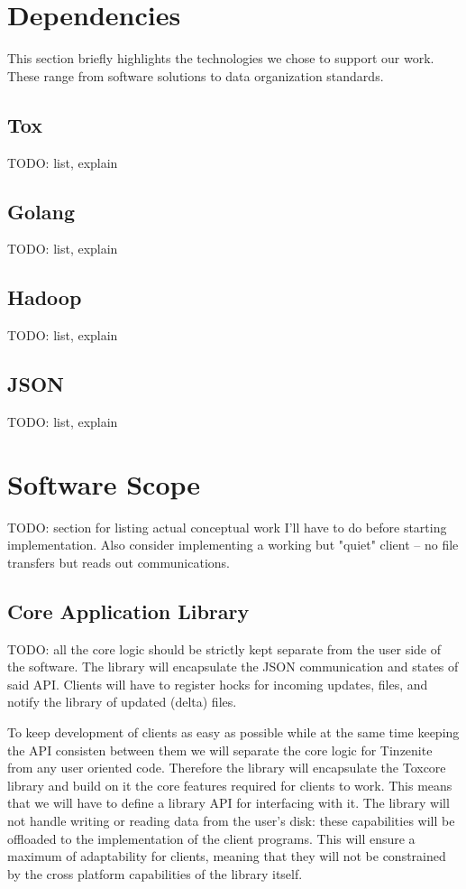 \section{Dependencies}

This section briefly highlights the technologies we chose to support our work.
These range from software solutions to data organization standards.

\subsection{Tox}

TODO: list, explain

\subsection{Golang}

TODO: list, explain

\subsection{Hadoop}

TODO: list, explain

\subsection{JSON}

TODO: list, explain

\section{Software Scope}

TODO: section for listing actual conceptual work I'll have to do before starting implementation.
Also consider implementing a working but "quiet" client – no file transfers but reads out communications.

\subsection{Core Application Library}

TODO: all the core logic should be strictly kept separate from the user side of the software.
The library will encapsulate the JSON communication and states of said API.
Clients will have to register hocks for incoming updates, files, and notify the library of updated (delta) files.

To keep development of clients as easy as possible while at the same time keeping the API consisten between them we will separate the core logic for Tinzenite from any user oriented code.
Therefore the library will encapsulate the Toxcore library and build on it the core features required for clients to work.
This means that we will have to define a library API for interfacing with it.
The library will not handle writing or reading data from the user's disk: these capabilities will be offloaded to the implementation of the client programs.
This will ensure a maximum of adaptability for clients, meaning that they will not be constrained by the cross platform capabilities of the library itself.

